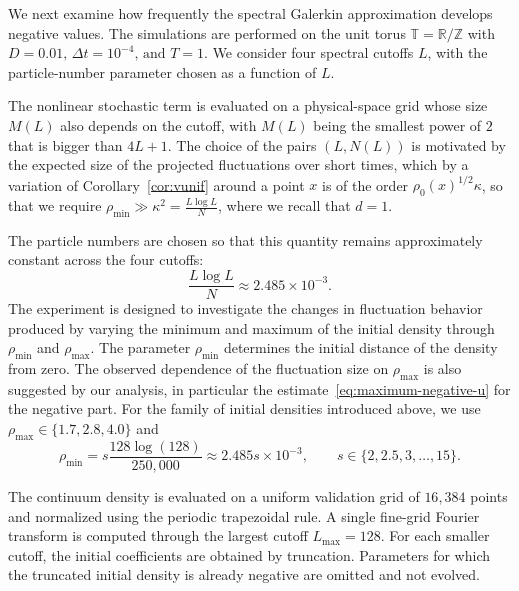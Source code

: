 \documentclass[a4paper,12pt]{article}
\begin{document}
We next examine how frequently the spectral Galerkin approximation develops
negative values. The simulations are performed on the unit
torus $\mathbb T=\mathbb R/\mathbb Z$ with
\(
D=0.01,\,\Delta t=10^{-4},\,\text{and }T=1.
\)
We consider four spectral cutoffs $L$, with the particle-number parameter
chosen as a function of $L$.  

The nonlinear stochastic term is evaluated on a physical-space grid whose
size $M(L)$ also depends on the cutoff, with $M(L)$ being the smallest power of $2$ that is bigger than $4L+1$. The choice of the pairs $(L,N(L))$ is motivated by the expected size of
the projected fluctuations over short times, which by a variation of Corollary~\ref{cor:vunif} around a point $x$ is of the order $\rho_0(x)^{1/2} \kappa$, so that we require 
$\rho_{\min}
\gg \kappa^2 =
\frac{L\log L}{N}$, where we recall that $d=1$.


The particle numbers are chosen so that this quantity remains approximately
constant across the four cutoffs:
\[
\frac{L\log L}{N}
\approx
2.485\times10^{-3}.
\]
The experiment
is designed to investigate the changes in fluctuation behavior
produced by varying the minimum and maximum of the initial density through
$\rho_{\min}$ and $\rho_{\max}$. The parameter $\rho_{\min}$ determines the initial distance of
the density from zero. The observed dependence of the fluctuation size on $\rho_{\max}$ is also suggested by our analysis, in particular the estimate~\eqref{eq:maximum-negative-u} for the negative part. For the family of initial densities introduced above, we use $\rho_{\max}\in\{1.7,2.8,4.0\}$
and
\[
\rho_{\min}
=
s\frac{128\log(128)}{250{,}000}\approx
2.485 s \times10^{-3},
\qquad
s\in\{2,2.5,3,\ldots,15\}.
\]

The continuum density is evaluated on a uniform validation grid of
$16{,}384$ points and normalized using the periodic trapezoidal rule. A
single fine-grid Fourier transform is computed through the largest cutoff
$L_{\max}=128$. For each smaller cutoff, the initial coefficients are
obtained by truncation. Parameters for which the truncated initial density is already negative are omitted and not evolved.
\end{document}
